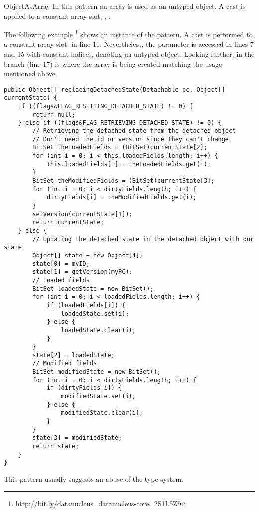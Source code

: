 \begin{pattern}{ObjectAsArray}
In this pattern an array is used as an untyped object.
A cast is applied to a constant array slot, \eg, .

\instances{}
The following example%
\footnote{\url{http://bit.ly/datanucleus_datanucleus-core_2S1L5Zf}}
shows an instance of the \thisp{} pattern.
A cast is performed to a constant array slot:  in line 11.
Nevertheless, the  parameter is accessed in lines 7 and 15 with constant indices, denoting an untyped object.
Looking further, in the  branch (line 17) is where the array is being created matching the usage mentioned above.

\begin{verbatim}
public Object[] replacingDetachedState(Detachable pc, Object[] currentState) {
    if ((flags&FLAG_RESETTING_DETACHED_STATE) != 0) {
        return null;
    } else if ((flags&FLAG_RETRIEVING_DETACHED_STATE) != 0) {
        // Retrieving the detached state from the detached object
        // Don't need the id or version since they can't change
        BitSet theLoadedFields = (BitSet)currentState[2];
        for (int i = 0; i < this.loadedFields.length; i++) {
            this.loadedFields[i] = theLoadedFields.get(i);
        }
        BitSet theModifiedFields = (BitSet)currentState[3];
        for (int i = 0; i < dirtyFields.length; i++) {
            dirtyFields[i] = theModifiedFields.get(i);
        }
        setVersion(currentState[1]);
        return currentState;
    } else {
        // Updating the detached state in the detached object with our state
        Object[] state = new Object[4];
        state[0] = myID;
        state[1] = getVersion(myPC);
        // Loaded fields
        BitSet loadedState = new BitSet();
        for (int i = 0; i < loadedFields.length; i++) {
            if (loadedFields[i]) {
                loadedState.set(i);
            } else {
                loadedState.clear(i);
            }
        }
        state[2] = loadedState;
        // Modified fields
        BitSet modifiedState = new BitSet();
        for (int i = 0; i < dirtyFields.length; i++) {
            if (dirtyFields[i]) {
                modifiedState.set(i);
            } else {
                modifiedState.clear(i);
            }
        }
        state[3] = modifiedState;
        return state;
    }
}
\end{verbatim}

\detection{}

\discussion{}
%
%
This pattern usually suggests an abuse of the type system.

\related{}

\end{pattern}